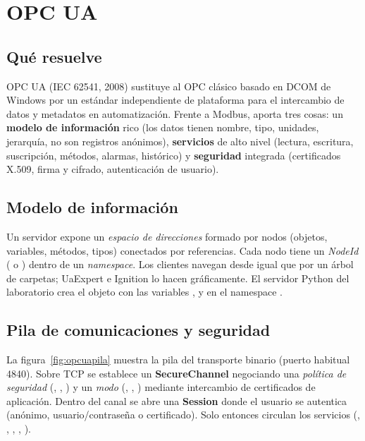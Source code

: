 \section{OPC UA}
\label{sec:opcua}

\subsection{Qué resuelve}

OPC UA (IEC 62541, 2008) sustituye al OPC clásico basado en DCOM de Windows por un estándar independiente de plataforma para el intercambio de datos y metadatos en automatización. Frente a Modbus, aporta tres cosas: un \textbf{modelo de información} rico (los datos tienen nombre, tipo, unidades, jerarquía, no son registros anónimos), \textbf{servicios} de alto nivel (lectura, escritura, suscripción, métodos, alarmas, histórico) y \textbf{seguridad} integrada (certificados X.509, firma y cifrado, autenticación de usuario).

\subsection{Modelo de información}

Un servidor expone un \emph{espacio de direcciones} formado por nodos (objetos, variables, métodos, tipos) conectados por referencias. Cada nodo tiene un \emph{NodeId} ( o ) dentro de un \emph{namespace}. Los clientes navegan desde  igual que por un árbol de carpetas; UaExpert e Ignition lo hacen gráficamente. El servidor Python del laboratorio crea el objeto  con las variables ,  y  en el namespace .

\subsection{Pila de comunicaciones y seguridad}

La figura~\ref{fig:opcuapila} muestra la pila del transporte binario  (puerto habitual 4840). Sobre TCP se establece un \textbf{SecureChannel} negociando una \emph{política de seguridad} (, , ) y un \emph{modo} (, , ) mediante intercambio de certificados de aplicación. Dentro del canal se abre una \textbf{Session} donde el usuario se autentica (anónimo, usuario/contraseña o certificado). Solo entonces circulan los servicios (, , , , ).

